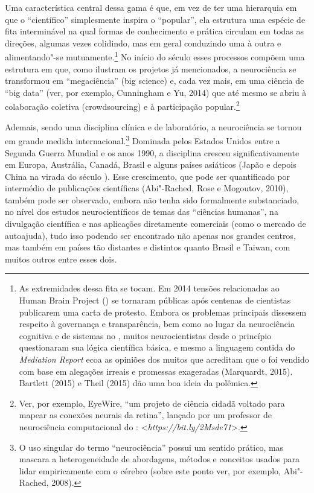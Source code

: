 Uma característica central dessa gama é que, em vez de ter uma
hierarquia em que o ``científico'' simplesmente inspira o ``popular'',
ela estrutura uma espécie de fita interminável na qual formas de
conhecimento e prática circulam em todas as direções, algumas vezes
colidindo, mas em geral conduzindo uma à outra e alimentando"-se
mutuamente.\footnote[4]{As extremidades dessa fita se tocam. Em 2014 tensões relacionadas
ao Human Brain Project () se tornaram públicas após centenas de
cientistas publicarem uma carta de protesto. Embora os problemas
principais dissessem respeito à governança e transparência, bem como ao
lugar da neurociência cognitiva e de sistemas no , muitos
neurocientistas desde o princípio questionaram sua lógica científica
básica, e mesmo a linguagem contida do \emph{Mediation Report} ecoa as
opiniões dos muitos que acreditam que o  foi vendido com base em
alegações irreais e promessas exageradas (Marquardt, 2015). Bartlett
(2015) e Theil (2015) dão uma boa ideia da polêmica.} No início do século  esses processos
compõem uma estrutura em que, como ilustram os projetos já mencionados,
a neurociência se transformou em ``megaciência'' (big science) e, cada
vez mais, em uma ciência de ``big data'' (ver, por exemplo, Cunningham e
Yu, 2014) que até mesmo se abriu à colaboração coletiva (crowdsourcing)
e à participação popular.\footnote[5]{Ver, por exemplo, EyeWire, ``um projeto de ciência cidadã voltado
para mapear as conexões neurais da retina'', lançado por um professor de
neurociência computacional do :
\textless{}\emph{https://bit.ly/2Msde71}\textgreater{}.}

Ademais, sendo uma disciplina clínica e de laboratório, a neurociência
se tornou em grande medida internacional.\footnote[6]{O uso singular do termo ``neurociência'' possui um sentido prático,
mas mascara a heterogeneidade de abordagens, métodos e conceitos usados
para lidar empiricamente com o cérebro (sobre este ponto ver, por
exemplo, Abi"-Rached, 2008).} Dominada
pelos Estados Unidos entre a Segunda Guerra Mundial e os anos 1990, a
disciplina cresceu significativamente em Europa, Austrália, Canadá,
Brasil e alguns países asiáticos (Japão e depois China na virada do
século ). Esse crescimento, que pode ser quantificado por intermédio
de publicações científicas (Abi"-Rached, Rose e Mogoutov, 2010), também
pode ser observado, embora não tenha sido formalmente substanciado, no
nível dos estudos neurocientíficos de temas das ``ciências humanas'', na
divulgação científica e nas aplicações diretamente comerciais (como o
mercado de autoajuda), tudo isso podendo ser encontrado não apenas nos
grandes centros, mas também em países tão distantes e distintos quanto
Brasil e Taiwan, com muitos outros entre esses dois.

